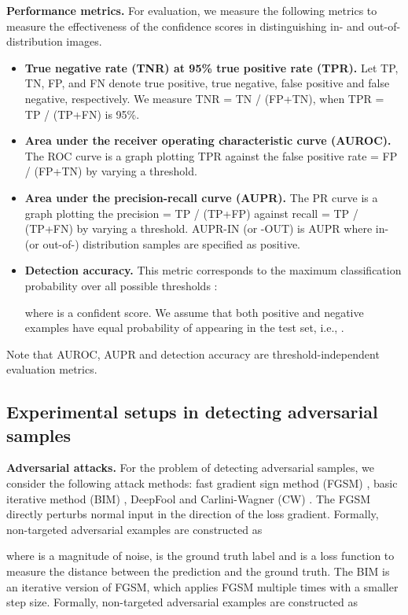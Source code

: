 \documentclass{article}
\begin{document}
{\bf Performance metrics.} For evaluation, we measure the following metrics to measure the effectiveness of the confidence scores in distinguishing in- and out-of-distribution images.
\begin{itemize}
\item {\bf True negative rate (TNR) at 95\% true positive rate (TPR).} Let TP, TN, FP, and FN denote true positive, true negative, false positive and false negative, respectively. We measure TNR = TN / (FP+TN), when TPR = TP / (TP+FN) is 95\%. 
\item {\bf Area under the receiver operating characteristic curve (AUROC).} The ROC curve is a graph plotting TPR against the false positive rate = FP / (FP+TN) by varying a threshold. 
\item {\bf Area under the precision-recall curve (AUPR).} The PR curve is a graph plotting the precision = TP / (TP+FP) against recall = TP / (TP+FN) by varying a threshold. AUPR-IN (or -OUT) is AUPR where in- (or out-of-) distribution samples are specified as positive.
\item {\bf Detection accuracy.} This metric corresponds to the maximum classification probability over all possible thresholds :

where  is a confident score. 
We assume that both positive and negative examples have equal probability of appearing in the test set, i.e., . 
\end{itemize}
Note that AUROC, AUPR and detection accuracy are threshold-independent evaluation metrics.

\subsection{Experimental setups in detecting adversarial samples} \label{appendix:exp_setup_adver}

{\bf Adversarial attacks.} For the problem of detecting adversarial samples, we consider the following attack methods: fast gradient sign method (FGSM) \citep{goodfellow2014explaining}, basic iterative method (BIM) \citep{kurakin2016adversarial}, DeepFool \citep{moosavi2016deepfool} and Carlini-Wagner (CW) \citep{carlini2017adversarial}. 
The FGSM directly perturbs normal input in the direction of the loss gradient. 
Formally, non-targeted adversarial examples are constructed as

where  is a magnitude of noise,  is the ground truth label and  is a loss function to measure the distance between the prediction and the ground truth.
The BIM is an iterative version of FGSM, which applies FGSM multiple times with a smaller step size.
Formally, non-targeted adversarial examples are constructed as
\end{document}
